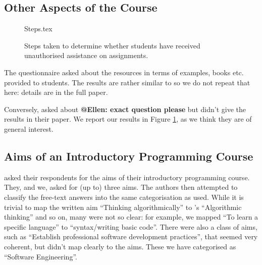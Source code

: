 \documentclass{sig-alternate}
\begin{document}
\subsection{Other Aspects of the Course}

\begin{figure}
\begin{center}
{Steps.tex}
\end{center}\vskip-18pt
\caption{Steps taken to determine whether students have received unauthorised assistance on assignments.\label{fig:Plagiarise}}
\end{figure}

The questionnaire asked about the resources in terms of examples,
books etc. provided to students. The results are rather similar to
\cite[Figure 14]{mason+cooper:2014} so we do not repeat that here:
details are in the full paper.

Conversely, \cite{mason+cooper:2014} asked about {\bf @Ellen: exact
  question please} but didn't give the results  in their paper. We
report our results in Figure \ref{fig:Plagiarise}, as we think they
are of general interest. 


\subsection{Aims of an Introductory Programming Course}

 \cite{mason+cooper:2014} asked their respondents for the aims of
their introductory programming course. They, and we, asked for (up to)
three aims. The authors then attempted to classify the free-text
answers into the same categorisation as \cite{mason+cooper:2014}
used. While it is trivial to map the written aim ``Thinking
algorithmically'' to \cite{mason+cooper:2014}'s ``Algorithmic
thinking'' and so on, many were not so clear: for example, we mapped
``To learn a specific language'' to ``syntax/writing basic
code''. There were also a class of aims, such as ``Establish
professional software development practices'', that seemed very
coherent, but didn't map clearly to the \cite{mason+cooper:2014}
aims. These we have categorised as ``Software Engineering''.
\end{document}
